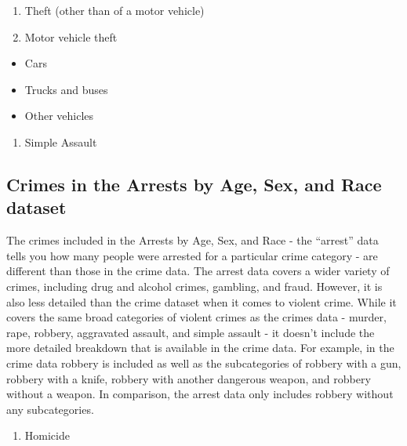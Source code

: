 \documentclass[
  12pt,
  openany]{book}
\providecommand{\tightlist}{%
  \setlength{\itemsep}{0pt}\setlength{\parskip}{0pt}}
\begin{document}
\begin{enumerate}
\def\labelenumi{\arabic{enumi}.}
\setcounter{enumi}{5}
\tightlist
\item
  Theft (other than of a motor vehicle)\\
\item
  Motor vehicle theft\\
\end{enumerate}

\begin{itemize}
\tightlist
\item
  Cars\\
\item
  Trucks and buses\\
\item
  Other vehicles\\
\end{itemize}

\begin{enumerate}
\def\labelenumi{\arabic{enumi}.}
\setcounter{enumi}{7}
\tightlist
\item
  Simple Assault
\end{enumerate}

\hypertarget{crimes-in-the-arrests-by-age-sex-and-race-dataset}{%
\subsection{Crimes in the Arrests by Age, Sex, and Race dataset}\label{crimes-in-the-arrests-by-age-sex-and-race-dataset}}

The crimes included in the Arrests by Age, Sex, and Race - the ``arrest'' data tells you how many people were arrested for a particular crime category - are different than those in the crime data. The arrest data covers a wider variety of crimes, including drug and alcohol crimes, gambling, and fraud. However, it is also less detailed than the crime dataset when it comes to violent crime. While it covers the same broad categories of violent crimes as the crimes data - murder, rape, robbery, aggravated assault, and simple assault - it doesn't include the more detailed breakdown that is available in the crime data. For example, in the crime data robbery is included as well as the subcategories of robbery with a gun, robbery with a knife, robbery with another dangerous weapon, and robbery without a weapon. In comparison, the arrest data only includes robbery without any subcategories.

\begin{enumerate}
\def\labelenumi{\arabic{enumi}.}
\tightlist
\item
  Homicide
\end{enumerate}
\end{document}
